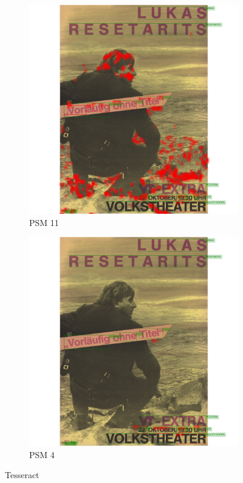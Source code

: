 \begin{figure}[hbtp!]
    \begin{subfigure}{0.45\textwidth}
        \includegraphics[scale=0.29]{obrazky/plakaty/result_tesseract_vienna2_nosplit_psm11-83.png}
        \caption{PSM 11}
        \label{Im4:ex:tess11}
    \end{subfigure}

    \begin{subfigure}{0.45\textwidth}
        \includegraphics[scale=0.29]{obrazky/plakaty/result_tesseract_vienna2_split_psm4-83.png}
        \caption{PSM 4}
        \label{Im4:ex:tess4}
    \end{subfigure}

    \caption{Tesseract}
    \label{Im3:ex:tess}
\end{figure}


